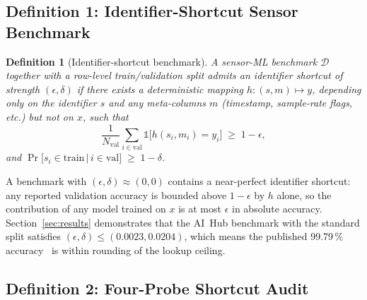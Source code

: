 \documentclass[3p,times,authoryear]{elsarticle}
\newtheorem{definition}{Definition}
\theoremstyle{remark}
\begin{document}
\subsection{Definition 1: Identifier-Shortcut Sensor Benchmark}

\begin{definition}[Identifier-shortcut benchmark]\label{def:shortcut}
A sensor-ML benchmark $\mathcal{D}$ together with a row-level
train/validation split admits an \emph{identifier shortcut} of
strength $(\epsilon, \delta)$ if there exists a deterministic
mapping $h \colon (s, m) \mapsto y$, depending only on the
identifier $s$ and any meta-columns $m$ (timestamp, sample-rate
flags, etc.) but not on $x$, such that
\[
  \frac{1}{N_{\mathrm{val}}} \sum_{i \in \mathrm{val}}
  \mathbb{1}\bigl[h(s_i, m_i) = y_i\bigr] \;\geq\; 1 - \epsilon,
\]
and $\Pr\bigl[s_i \in \mathrm{train}\,|\,i \in \mathrm{val}\bigr]
\;\geq\; 1 - \delta$.
\end{definition}

A benchmark with $(\epsilon, \delta) \approx (0, 0)$ contains a
near-perfect identifier shortcut: any reported validation
accuracy is bounded above $1 - \epsilon$ by $h$ alone, so the
contribution of any model trained on $x$ is at most $\epsilon$ in
absolute accuracy. Section~\ref{sec:results} demonstrates that
the AI~Hub benchmark with the standard split satisfies
$(\epsilon, \delta) \leq (0.0023, 0.0204)$,
which means the published 99.79\,\% accuracy~\cite{lee2023leak}
is within rounding of the lookup ceiling.

\subsection{Definition 2: Four-Probe Shortcut Audit}\label{sec:method-audit}
\end{document}
